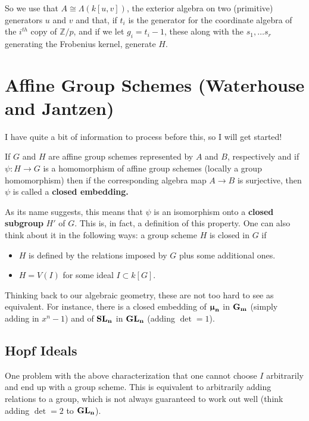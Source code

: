\documentclass[12pt]{article}
\theoremstyle{nonumberbreak}
\theoremstyle{changebreak}
\theoremstyle{nonumberplain}
\theoremstyle{change}
\newcommand*{\bbZ}{\mathbb{Z}}
\newcommand*{\Gm}{\ensuremath\mathbf{G_m}}
\newcommand*{\GL}[1]{\ensuremath\mathbf{GL_#1}}
\newcommand*{\SL}[1]{\ensuremath\mathbf{SL_#1}}
\newcommand*{\mun}[1]{\ensuremath\mathbf{\bm\upmu_#1}}
\begin{document}
So we use that $A\cong \Lambda(k[u,v])$, the exterior algebra on two (primitive) generators $u$ and $v$
and that, if $t_i$ is the generator for the coordinate algebra of the $i^{th}$ copy of $\bbZ/p$, and if 
we let $g_i=t_i-1$, these along with the $s_1,\dots s_r$ generating the Frobenius kernel, generate $H$.




\newpage
\section{Affine Group Schemes (Waterhouse and Jantzen)}
I have quite a bit of information to process before this, so I will get started!
\begin{defn}
	If $G$ and $H$ are affine group schemes represented by $A$ and $B$, respectively and
	if $\psi:H\to G$ is a homomorphism of affine group schemes (locally a group homomorphism)
	then if the corresponding algebra map $A\to B$ is surjective, then $\psi$ is called
	a \textbf{closed embedding.}
\end{defn}

As its name suggests, this means that $\psi$ is an isomorphism onto a \textbf{closed subgroup}
$H'$ of $G$. This is, in fact, a definition of this property. One can also think about 
it in the following ways: a group scheme $H$ is closed in $G$ if
\begin{itemize}
	\item $H$ is defined by the relations imposed by $G$ plus some additional ones.
	\item $H=V(I)$ for some ideal $I\subset k[G]$. 
\end{itemize}
Thinking back to our algebraic geometry, these are not too hard to see as equivalent. 
For instance, there is a closed embedding of $\mun n$ in $\Gm$ (simply adding in $x^n-1$)
and of $\SL{n}$ in $\GL{n}$ (adding $\det = 1$).

\subsection{Hopf Ideals}
One problem with the above characterization that one cannot choose $I$ arbitrarily and end
up with a group scheme. This is equivalent to arbitrarily adding relations to a group, which is
not always guaranteed to work out well (think adding $\det = 2$ to $\GL n$).
\end{document}
